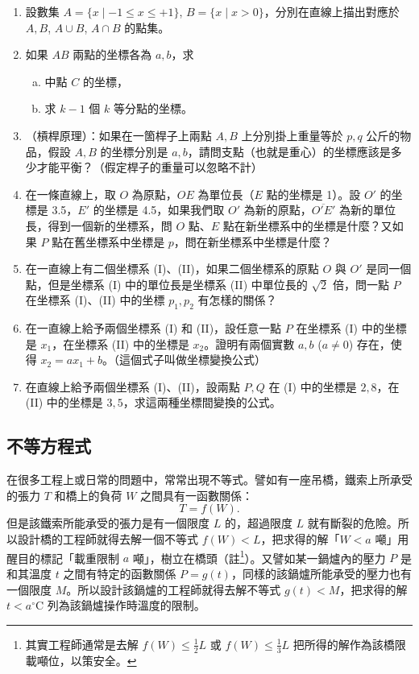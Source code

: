 \begin{enumerate}
    \item 設數集 $A=\{x \mid -1 \le x \le +1\}$, $B=\{x \mid x>0\}$，分別在直線上描出對應於 $A, B$, $A\cup B$, $A\cap B$ 的點集。

    \item 如果 $AB$ 兩點的坐標各為 $a, b$，求
    \begin{enumerate}[(a)]
        \item 中點 $C$ 的坐標，
        \item 求 $k-1$ 個 $k$ 等分點的坐標。
    \end{enumerate}

    \item （槓桿原理）：如果在一箇桿子上兩點 $A, B$ 上分別掛上重量等於 $p, q$ 公斤的物品，假設 $A, B$ 的坐標分別是 $a, b$，請問支點（也就是重心）的坐標應該是多少才能平衡？（假定桿子的重量可以忽略不計）

    \item 在一條直線上，取 $O$ 為原點，$OE$ 為單位長（$E$ 點的坐標是 1）。設 $O'$ 的坐標是 3.5，$E'$ 的坐標是 4.5，如果我們取 $O'$ 為新的原點，$\overline{O'E'}$ 為新的單位長，得到一個新的坐標系，問 $O$ 點、$E$ 點在新坐標系中的坐標是什麼？又如果 $P$ 點在舊坐標系中坐標是 $p$，問在新坐標系中坐標是什麼？

    \item 在一直線上有二個坐標系 (I)、(II)，如果二個坐標系的原點 $O$ 與 $O'$ 是同一個點，但是坐標系 (I) 中的單位長是坐標系 (II) 中單位長的 $\sqrt{2}$ 倍，問一點 $P$ 在坐標系 (I)、(II) 中的坐標 $p_1, p_2$ 有怎樣的關係？

    \item 在一直線上給予兩個坐標系 (I) 和 (II)，設任意一點 $P$ 在坐標系 (I) 中的坐標是 $x_1$，在坐標系 (II) 中的坐標是 $x_2$。證明有兩個實數 $a, b$ ($a\ne 0$) 存在，使得 $x_2 = ax_1+b$。（這個式子叫做坐標變換公式）

    \item 在直線上給予兩個坐標系 (I)、(II)，設兩點 $P, Q$ 在 (I) 中的坐標是 $2, 8$，在 (II) 中的坐標是 $3, 5$，求這兩種坐標間變換的公式。
\end{enumerate}

\subsection{不等方程式}\label{sec:b2_2-3}

在很多工程上或日常的問題中，常常出現不等式。譬如有一座吊橋，鐵索上所承受的張力 $T$ 和橋上的負荷 $W$ 之間具有一函數關係：
\[
T=f(W).
\]
但是該鐵索所能承受的張力是有一個限度 $L$ 的，超過限度 $L$ 就有斷裂的危險。所以設計橋的工程師就得去解一個不等式 $f(W)<L$，把求得的解「$W<a\text{ 噸}$」用醒目的標記「載重限制 $a$ 噸」，樹立在橋頭（註\footnote{其實工程師通常是去解 $f(W)\le \frac{1}{2}L$ 或 $f(W)\le \frac{1}{3}L$ 把所得的解作為該橋限載噸位，以策安全。}）。又譬如某一鍋爐內的壓力 $P$ 是和其溫度 $t$ 之間有特定的函數關係 $P=g(t)$，同樣的該鍋爐所能承受的壓力也有一個限度 $M$。所以設計該鍋爐的工程師就得去解不等式 $g(t)<M$，把求得的解 $t<a^\circ\text{C}$ 列為該鍋爐操作時溫度的限制。

